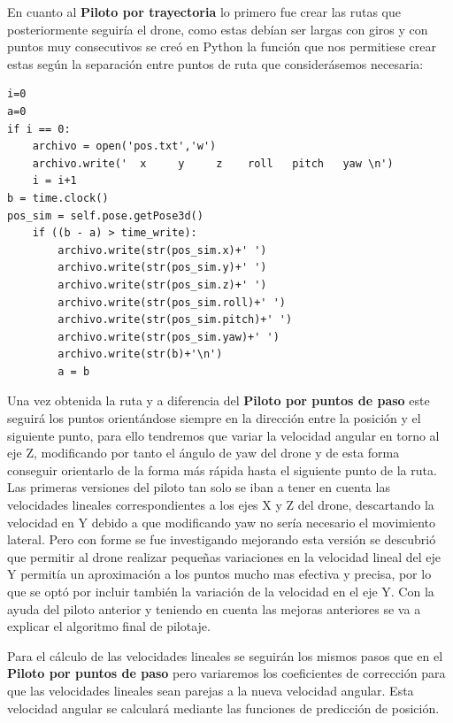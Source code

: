 \hspace{1cm} En cuanto al \textbf{Piloto por trayectoria} lo primero fue crear las rutas que posteriormente seguiría el drone, como estas debían ser largas con giros y con puntos muy consecutivos se creó en Python la función que nos permitiese crear estas según la separación entre puntos de ruta que considerásemos necesaria: 
\begin{lstlisting}[backgroundcolor=\color{gray!15}]
i=0
a=0
if i == 0:
    archivo = open('pos.txt','w')
    archivo.write('  x     y     z    roll   pitch   yaw \n')
    i = i+1
b = time.clock()
pos_sim = self.pose.getPose3d()
    if ((b - a) > time_write):
        archivo.write(str(pos_sim.x)+' ')
        archivo.write(str(pos_sim.y)+' ')
        archivo.write(str(pos_sim.z)+' ')
        archivo.write(str(pos_sim.roll)+' ')
        archivo.write(str(pos_sim.pitch)+' ')
        archivo.write(str(pos_sim.yaw)+' ')
        archivo.write(str(b)+'\n')
        a = b 
\end{lstlisting}

\hspace{1cm} Una vez obtenida la ruta y a diferencia del \textbf{Piloto por puntos de paso} este seguirá los puntos orientándose siempre en la dirección entre la posición y el siguiente punto, para ello tendremos que variar la velocidad angular en torno al eje Z, modificando por tanto el ángulo de yaw del drone y de esta forma conseguir orientarlo de la forma más rápida hasta el siguiente punto de la ruta. Las primeras versiones del piloto tan solo se iban a tener en cuenta las velocidades lineales correspondientes a los ejes X y Z del drone, descartando la velocidad en Y debido a que modificando yaw no sería necesario el movimiento lateral. Pero con forme se fue investigando  mejorando esta versión se descubrió que permitir al drone realizar pequeñas variaciones en la velocidad lineal del eje Y permitía un aproximación a los puntos mucho mas efectiva y precisa, por lo que se optó por incluir también la variación de la velocidad en el eje Y. Con la ayuda del piloto anterior y teniendo en cuenta las mejoras anteriores se va a explicar el algoritmo final de pilotaje. 

\hspace{1cm} Para el cálculo de las velocidades lineales se seguirán los mismos pasos que en el \textbf{Piloto por puntos de paso} pero variaremos los coeficientes de corrección para que las velocidades lineales sean parejas a la nueva velocidad angular. Esta velocidad angular se calculará mediante las funciones de predicción de posición. 

